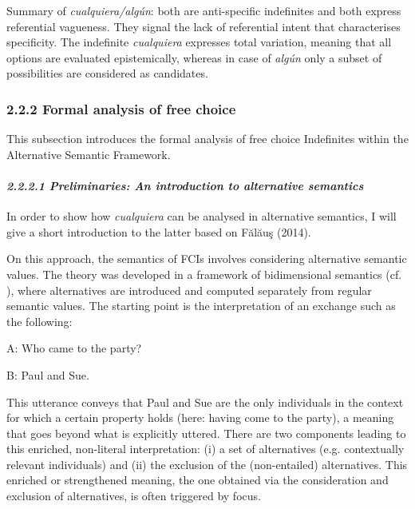 \documentclass[output=paper]{langscibook}
\begin{document}
  Summary of \textit{cualquiera/algún}: both are anti-specific indefinites and both express referential vagueness. They signal the lack of referential intent that characterises specificity. The indefinite \textit{cualquiera} expresses total variation, meaning that all options are evaluated epistemically, whereas in case of \textit{algún} only a subset of possibilities are considered as candidates. 

\subsubsection{\textbf{2.2.2} \textbf{Formal} \textbf{analysis} \textbf{of} \textbf{free} \textbf{choice}}

This subsection introduces the formal analysis of free choice Indefinites within the Alternative Semantic Framework.

\paragraph{\textit{2.2.2.1 Preliminaries: An introduction to alternative semantics}}

In order to show how \textit{cualquiera} can be analysed in alternative semantics, I will give a short introduction to the latter based on Fălăuş (2014).

  On this approach, the semantics of FCIs involves considering alternative semantic values. The theory was developed in a framework of bidimensional semantics (cf. \citealt{Rooth1985}), where alternatives are introduced and computed separately from regular semantic values. The starting point is the interpretation of an exchange such as the following:

  A: Who came to the party? 

B: Paul and Sue.

This utterance conveys that Paul and Sue are the only individuals in the context for which a certain property holds (here: having come to the party), a meaning that goes beyond what is explicitly uttered. There are two components leading to this enriched, non-literal interpretation: (i) a set of alternatives (e.g. contextually relevant individuals) and (ii) the exclusion of the (non-entailed) alternatives. This enriched or strengthened meaning, the one obtained via the consideration and exclusion of alternatives, is often triggered by focus.
\end{document}
